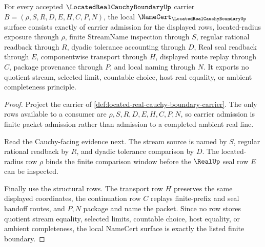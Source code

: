 \begin{theorem}
\label{thm:located-real-cauchy-boundary-namecert-obligations}
For every accepted $\LocatedRealCauchyBoundaryUp$ carrier $B=(\rho,S,R,D,E,H,C,P,N)$, the local $\NameCert_{\LocatedRealCauchyBoundaryUp}$ surface consists exactly of carrier admission for the displayed rows, located-radius exposure through $\rho$, finite StreamName inspection through $S$, regular rational readback through $R$, dyadic tolerance accounting through $D$, Real seal readback through $E$, componentwise transport through $H$, displayed route replay through $C$, package provenance through $P$, and local naming through $N$. It exports no quotient stream, selected limit, countable choice, host real equality, or ambient completeness principle.
\end{theorem}
\begin{proof}
Project the carrier of \autoref{def:located-real-cauchy-boundary-carrier}. The only rows available to a consumer are $\rho,S,R,D,E,H,C,P,N$, so carrier admission is finite packet admission rather than admission to a completed ambient real line.

Read the Cauchy-facing evidence next. The stream source is named by $S$, regular rational readback by $R$, and dyadic tolerance comparison by $D$. The located-radius row $\rho$ binds the finite comparison window before the $\RealUp$ seal row $E$ can be inspected.

Finally use the structural rows. The transport row $H$ preserves the same displayed coordinates, the continuation row $C$ replays finite-prefix and seal handoff routes, and $P,N$ package and name the packet. Since no row stores quotient stream equality, selected limits, countable choice, host equality, or ambient completeness, the local NameCert surface is exactly the listed finite boundary.
\end{proof}

